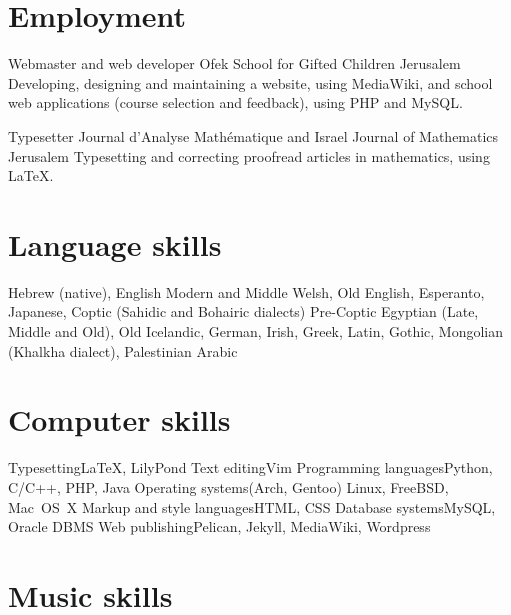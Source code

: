 \section{Employment}

	{Webmaster and web developer}
	{Ofek School for Gifted Children}
	{Jerusalem}
	{}
	{Developing, designing and maintaining a website, using MediaWiki, and school web applications (course selection and feedback), using PHP and MySQL.}

	{Typesetter}
	{Journal d’Analyse Mathématique and Israel Journal of Mathematics}
	{Jerusalem}
	{}
	{Typesetting and correcting proofread articles in mathematics, using \LaTeX .}



\section{Language skills}

	{Hebrew (native), English}
	{Modern and Middle Welsh, Old English, Esperanto, Japanese, Coptic (Sahidic and Bohairic dialects)}
	{Pre-Coptic Egyptian (Late, Middle and Old), Old Icelandic, German, Irish, Greek, Latin, Gothic, Mongolian (Khalkha dialect), Palestinian Arabic}



\section{Computer skills}

\cvdoubleitem
	{Typesetting}{{\texfont\LaTeX}, LilyPond}
	{Text editing}{Vim}
\cvdoubleitem
	{Programming languages}{Python, C/C++, PHP, Java}
	{Operating systems}{(Arch, Gentoo) Linux, FreeBSD, Mac~OS~X}
\cvdoubleitem
	{Markup and style languages}{HTML, CSS}
	{Database systems}{MySQL, Oracle DBMS}
\cvdoubleitem
	{Web publishing}{Pelican, Jekyll, MediaWiki, Wordpress}
	{}{}



\section{Music skills}



